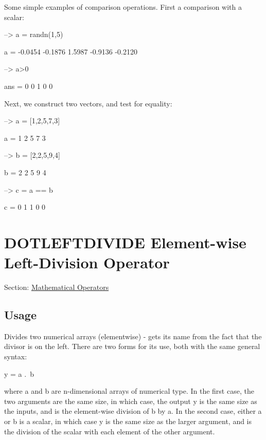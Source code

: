Some simple examples of comparison operations. First a comparison with a scalar\-:


\begin{DoxyVerbInclude}
--> a = randn(1,5)

a = 
   -0.0454   -0.1876    1.5987   -0.9136   -0.2120 

--> a>0

ans = 
 0 0 1 0 0 
\end{DoxyVerbInclude}


Next, we construct two vectors, and test for equality\-:


\begin{DoxyVerbInclude}
--> a = [1,2,5,7,3]

a = 
 1 2 5 7 3 

--> b = [2,2,5,9,4]

b = 
 2 2 5 9 4 

--> c = a == b

c = 
 0 1 1 0 0 
\end{DoxyVerbInclude}
 \hypertarget{operators_dotleftdivide}{}\section{D\-O\-T\-L\-E\-F\-T\-D\-I\-V\-I\-D\-E Element-\/wise Left-\/\-Division Operator}\label{operators_dotleftdivide}
Section\-: \hyperlink{sec_operators}{Mathematical Operators} \hypertarget{vtkwidgets_vtkxyplotwidget_Usage}{}\subsection{Usage}\label{vtkwidgets_vtkxyplotwidget_Usage}
Divides two numerical arrays (elementwise) -\/ gets its name from the fact that the divisor is on the left. There are two forms for its use, both with the same general syntax\-: \begin{DoxyVerb}  y = a .\ b
\end{DoxyVerb}
 where {\ttfamily a} and {\ttfamily b} are {\ttfamily n}-\/dimensional arrays of numerical type. In the first case, the two arguments are the same size, in which case, the output {\ttfamily y} is the same size as the inputs, and is the element-\/wise division of {\ttfamily b} by {\ttfamily a}. In the second case, either {\ttfamily a} or {\ttfamily b} is a scalar, in which case {\ttfamily y} is the same size as the larger argument, and is the division of the scalar with each element of the other argument.

